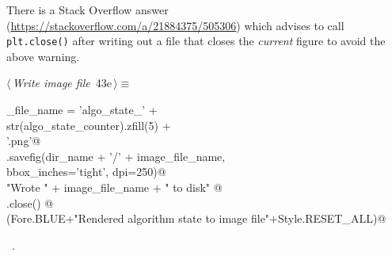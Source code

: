 \documentclass[11.5pt]{report}
\begin{document}
There is a  Stack Overflow answer (\url{https://stackoverflow.com/a/21884375/505306}) 
which advises to call \verb|plt.close()| after writing out a file that closes the 
\textit{current} figure to avoid the above warning. 
\begin{flushleft} \small\label{scrap59}\raggedright\small
{} $\langle\,${\itshape Write image file}\nobreak\ {\footnotesize {43e}}$\,\rangle\equiv$
\vspace{-1ex}
\begin{list}{}{} \item
\mbox{}\verb@image_file_name = 'algo_state_'                    +\@\\
\mbox{}\verb@                  str(algo_state_counter).zfill(5) +\@\\
\mbox{}\verb@                     '.png'@\\
\mbox{}\verb@plt.savefig(dir_name + '/' + image_file_name,  \@\\
\mbox{}\verb@            bbox_inches='tight', dpi=250)@\\
\mbox{}\verb@print "Wrote " + image_file_name + " to disk"   @\\
\mbox{}\verb@plt.close() @\\
\mbox{}\verb@debug(Fore.BLUE+"Rendered algorithm state to image file"+Style.RESET_ALL)@\\
\mbox{}\verb@@{\NWsep}
\end{list}
\vspace{-1.5ex}
\footnotesize
\begin{list}{}{\setlength{\itemsep}{-\parsep}\setlength{\itemindent}{-\leftmargin}}
\item \NWtxtMacroRefIn\ .

\item{}
\end{list}
\vspace{4ex}
\end{flushleft}
\end{document}
